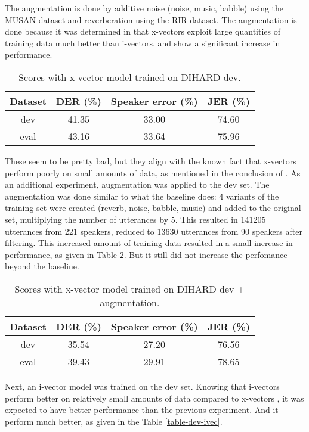 			The augmentation is done by additive noise (noise, music, babble) using the MUSAN dataset and reverberation using the RIR dataset. The augmentation is done because it was determined in \cite{snyder2018x} that x-vectors exploit large quantities of training data much better than i-vectors, and show a significant increase in performance.
			
			
			\begin{table}[h]
				\centering
				\begin{tabular}{|c|c|c|c|}
					\hline
					Dataset & DER (\%) & Speaker error (\%) & JER (\%) \\
					\hline
					dev & 41.35 & 33.00 & 74.60 \\
					\hline
					eval & 43.16 & 33.64 & 75.96 \\
					\hline
				\end{tabular}
				\caption{Scores with x-vector model trained on DIHARD dev.}
				\label{table-dev-xvec}
			\end{table}
		
		These seem to be pretty bad, but they align with the known fact that x-vectors perform poorly on small amounts of data, as mentioned in the conclusion of \cite{huang2018jhu}. As an additional experiment, augmentation was applied to the dev set. The augmentation was done similar to what the baseline does: 4 variants of the training set were created (reverb, noise, babble, music) and added to the original set, multiplying the number of utterances by 5. This resulted in 141205 utterances from 221 speakers, reduced to 13630 utterances from 90 speakers after filtering. This increased amount of training data resulted in a small increase in performance, as given in Table \ref{table-dev-xvec-aug}. But it still did not increase the perfomance beyond the baseline.
		
		\begin{table}[h]
			\centering
			\begin{tabular}{|c|c|c|c|}
				\hline
				Dataset & DER (\%) & Speaker error (\%) & JER (\%) \\
				\hline
				dev & 35.54 & 27.20 & 76.56 \\
				\hline
				eval & 39.43 & 29.91 & 78.65 \\
				\hline
			\end{tabular}
			\caption{Scores with x-vector model trained on DIHARD dev + augmentation.}
			\label{table-dev-xvec-aug}
		\end{table}
	
		Next, an i-vector model was trained on the dev set. Knowing that i-vectors perform better on relatively small amounts of data compared to x-vectors \cite{huang2018jhu}, it was expected to have better performance than the previous experiment. And it perform much better, as given in the Table \ref{table-dev-ivec}.
		
